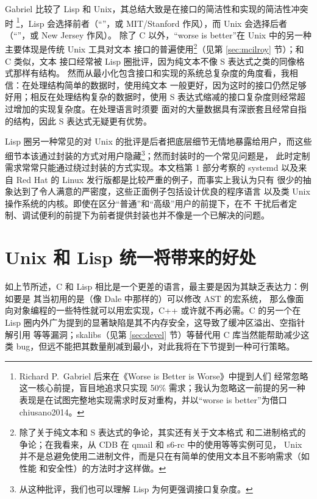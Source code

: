 Gabriel 比较了 Lisp 和 Unix，其总结大致是在接口的简洁性和实现的简洁性冲突时%
\footnote{Richard P.\ Gabriel 后来在《Worse is Better is Worse》中提到人们
经常忽略这一核心前提，盲目地追求只实现 50\% 需求；我认为忽略这一前提的另一种
表现是在试图完整地实现需求时反对重构，并以“worse is better”为借口\cupercite%
{chiusano2014}。}，Lisp 会选择前者（“”，或 MIT/Stanford
作风），而 Unix 会选择后者（“”，或 New Jersey 作风）。
除了 C 以外，“worse is better”在 Unix 中的另一种主要体现是传统 Unix 工具对文本
接口的普遍使用\footnote{除了关于纯文本和 S 表达式的争论，其实还有关于文本格式
和二进制格式的争论；在我看来，从 CDB 在 qmail 和 s6-rc 中的使用等等实例可见，%
Unix 并不是总避免使用二进制文件，而是只在有简单的使用文本且不影响需求（如性能
和安全性）的方法时才这样做。}（见第 \ref{sec:mcilroy} 节）；和 C 类似，文本
接口经常被 Lisp 圈批评，因为纯文本不像 S 表达式之类的同像格式那样有结构。
然而从最小化包含接口和实现的系统总复杂度的角度看，我相信：在处理结构简单的数据时，使用纯文本
一般更好，因为这时的接口仍然足够好用；相反在处理结构复杂的数据时，使用
S 表达式缩减的接口复杂度则经常超过增加的实现复杂度。在处理语言时须要
面对的大量数据具有深嵌套且经常自指的结构，因此 S 表达式无疑更有优势。

Lisp 圈另一种常见的对 Unix 的批评是后者把底层细节无情地暴露给用户，而这些
细节本该通过封装的方式对用户隐藏\footnote{从这种批评，我们也可以理解 Lisp
为何更强调接口复杂度。}；然而封装时的一个常见问题是，
此时定制需求常常只能通过绕过封装的方式实现。本文档第 1 部分考察的 systemd
以及来自 Red Hat 的 Linux 发行版都是比较严重的例子，而事实上我认为只有
很少的抽象达到了令人满意的严密度，这些正面例子包括设计优良的程序语言
以及类 Unix 操作系统的内核。即使在区分“普通”和“高级”用户的前提下，在不
干扰后者定制、调试便利的前提下为前者提供封装也并不像是一个已解决的问题。

\section{Unix 和 Lisp 统一将带来的好处}\label{sec:benefits}

如上节所述，C 和 Lisp 相比是一个更差的语言，最主要是因为其缺乏表达力：例如要是
其当初用的是（像 Dale 中那样的）可以修改 AST 的宏系统，
那么像面向对象编程的一些特性就可以用宏实现，C++ 或许就不再必需。C 的另一个在
Lisp 圈内外广为提到的显著缺陷是其不内存安全，这导致了缓冲区溢出、空指针解引用
等等漏洞；skalibs（见第 \ref{sec:devel} 节）等替代用 C 库当然能帮助减少这类
bug，但远不能把其数量削减到最小，对此我将在下节提到一种可行策略。

